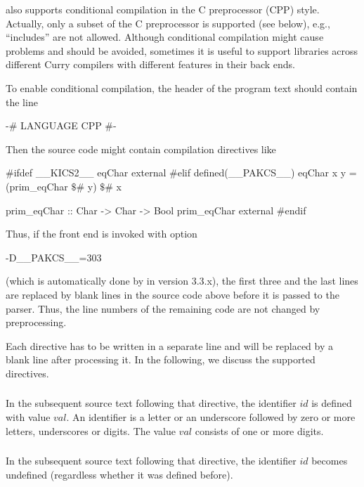 \CYS also supports conditional compilation
in the C preprocessor (CPP) style.
Actually, only a subset of the C preprocessor is supported (see below),
e.g., ``includes'' are not allowed.
Although conditional compilation might cause problems
and should be avoided, sometimes it is useful to support libraries
across different Curry compilers with different features
in their back ends.

To enable conditional compilation, the header of the program text
should contain the line
%
\begin{curry}
{-# LANGUAGE CPP #-}
\end{curry}
%
Then the source code might contain compilation directives like
%
\begin{curry}
#ifdef __KICS2__
eqChar external
#elif defined(__PAKCS__)
eqChar x y = (prim_eqChar $\$$# y) $\$$# x

prim_eqChar :: Char -> Char -> Bool
prim_eqChar external
#endif
\end{curry}
%
Thus, if the front end is invoked with option
\begin{curry}
-D__PAKCS__=303
\end{curry}
(which is automatically done by \CYS in version 3.3.x),
the first three and the last lines are replaced by blank lines
in the source code above before it is passed to the parser.
Thus, the line numbers of the remaining code are not changed
by preprocessing.

Each directive has to be written in a separate line and will
be replaced by a blank line after processing it.
In the following, we discuss the supported directives.

\subsubsection*{}

In the subsequent source text following that directive,
the identifier $\mathit{id}$ is defined with value $\mathit{val}$.
An identifier is a letter or an underscore followed by zero or more letters,
underscores or digits.
The value $\mathit{val}$ consists of one or more digits.

\subsubsection*{}

In the subsequent source text following that directive,
the identifier $\mathit{id}$ becomes undefined
(regardless whether it was defined before).

